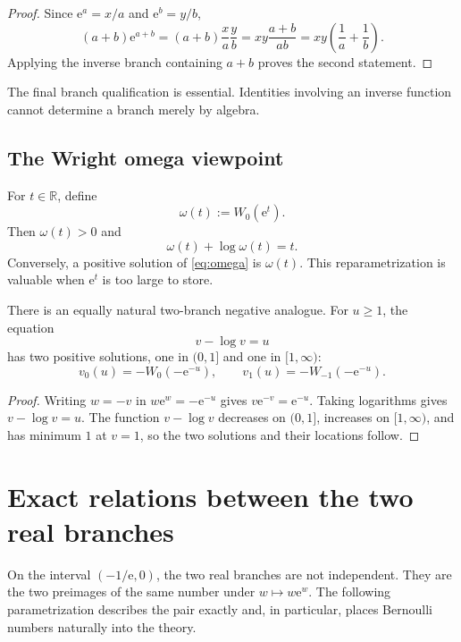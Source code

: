 \documentclass[11pt]{article}
\theoremstyle{remark}
\newcommand{\Wz}{W_0}
\newcommand{\Wm}{W_{-1}}
\newcommand{\ee}{\mathrm e}
\begin{document}
\begin{proof}
Since \(\ee^a=x/a\) and \(\ee^b=y/b\),
\[
 (a+b)\ee^{a+b}
 =(a+b)\frac{x}{a}\frac{y}{b}
 =xy\frac{a+b}{ab}
 =xy\left(\frac1a+\frac1b\right).
\]
Applying the inverse branch containing \(a+b\) proves the second statement.
\end{proof}

The final branch qualification is essential.  Identities involving an
inverse function cannot determine a branch merely by algebra.

\subsection{The Wright omega viewpoint}

For \(t\in\mathbb R\), define
\[
       \omega(t):=\Wz(\ee^t).
\]
Then \(\omega(t)>0\) and
\begin{equation}\label{eq:omega}
       \omega(t)+\log\omega(t)=t.
\end{equation}
Conversely, a positive solution of \eqref{eq:omega} is \(\omega(t)\).
This reparametrization is valuable when \(\ee^t\) is too large to store.

There is an equally natural two-branch negative analogue.  For \(u\geq1\),
the equation
\begin{equation}\label{eq:vminuslogv}
       v-\log v=u
\end{equation}
has two positive solutions, one in \((0,1]\) and one in \([1,\infty)\):
\[
 v_0(u)=-\Wz(-\ee^{-u}),\qquad
 v_1(u)=-\Wm(-\ee^{-u}).
\]

\begin{proof}
Writing \(w=-v\) in \(w\ee^w=-\ee^{-u}\) gives
\(v\ee^{-v}=\ee^{-u}\).  Taking logarithms gives
\(v-\log v=u\).  The function \(v-\log v\) decreases on \((0,1]\),
increases on \([1,\infty)\), and has minimum \(1\) at \(v=1\), so the two
solutions and their locations follow.
\end{proof}


\section{Exact relations between the two real branches}\label{sec:pairing}

On the interval \((-1/\ee,0)\), the two real branches are not independent.
They are the two preimages of the same number under \(w\mapsto w\ee^w\).
The following parametrization describes the pair exactly and, in particular,
places Bernoulli numbers naturally into the theory.
\end{document}
